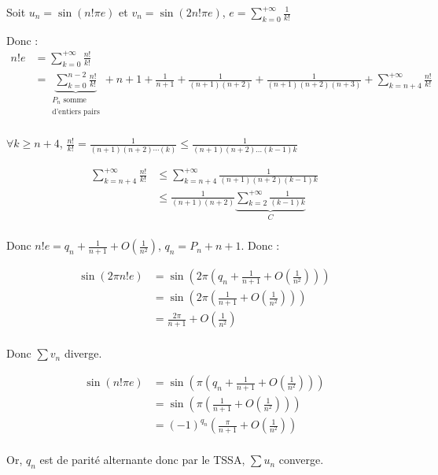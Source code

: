\begin{exemple}
    Soit $u_n = \sin(n! \pi e)$ et $v_n = \sin(2 n! \pi e)$, $\displaystyle e = \sum_{k = 0 }^{ + \infty } \frac{1}{k!}$

    Donc :
    \begin{align*}
        n! e & = \sum_{k = 0 }^{+ \infty } \frac{n!}{k!} \\
             & = \underbrace{\sum_{k = 0}^{n - 2} \frac{n!}{k!}}_{\substack{P_n \text{ somme} \\ \text{d'entiers pairs}}} + n + 1 + \frac{1}{n + 1} + \frac{1}{(n + 1)(n + 2)} + \frac 1 {(n + 1)(n + 2)(n + 3)} + \sum_{k = n + 4 }^{+ \infty } \frac{n! }{k!} \\
    \end{align*}

    $\displaystyle \forall k \geqslant n + 4$, $\displaystyle \frac{n!}{k!} = \frac{1}{(n + 1)(n + 2) \cdots (k)} \leqslant \frac{1}{(n + 1)(n + 2)\ldots(k - 1)k}$

    \begin{align*}
        \sum_{k = n + 4 }^{+ \infty } \frac{n! }{k!} & \leqslant \sum_{k = n + 4 }^{+\infty}\frac 1 {(n + 1)(n + 2) (k-1)k} \\
                                                     & \leqslant \frac 1 {(n + 1)(n + 2)} \underbrace{\sum_{k = 2}^{+\infty} \frac 1 {(k - 1)k}}_C \\
    \end{align*}

    Donc $n ! e = q_n + \frac 1 {n + 1} + O\left(\frac 1 {n^2}\right)$, $q_n = P_n + n + 1$. Donc :

    \begin{align*}
        \sin(2 \pi n! e) & = \sin \left( 2 \pi \left( q_n + \frac 1 {n + 1} + O\left( \frac 1 {n^2} \right) \right) \right) \\
                         & = \sin \left( 2 \pi \left( \frac 1 {n + 1} + O\left( \frac 1 {n^2} \right) \right) \right) \\
                         & = \frac {2 \pi}{n + 1} + O\left( \frac 1 {n^2} \right) \\
    \end{align*}

    Donc $\sum v_n$ diverge.
    
    \begin{align*}
        \sin(n! \pi e) & = \sin \left( \pi \left( q_n + \frac 1 {n + 1} + O\left( \frac 1 {n^2} \right) \right) \right) \\
                       & = \sin \left( \pi \left( \frac 1 {n + 1} + O\left( \frac 1 {n^2} \right) \right) \right) \\
                       & = (-1)^{q_n} \left( \frac{\pi}{n + 1} + O\left( \frac 1 {n^2} \right) \right) \\
    \end{align*}

    Or, $q_n$ est de parité alternante donc par le TSSA, $\sum u_n$ converge.
\end{exemple}

